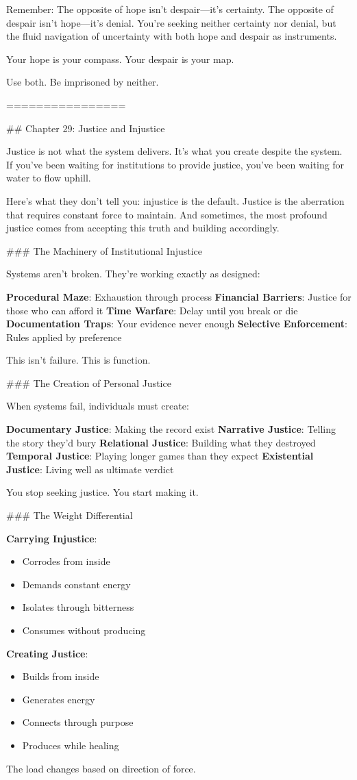 \documentclass[12pt]{book}
\begin{document}
Remember: The opposite of hope isn't despair—it's certainty. The opposite of despair isn't hope—it's denial. You're seeking neither certainty nor denial, but the fluid navigation of uncertainty with both hope and despair as instruments.

Your hope is your compass. Your despair is your map.

Use both. Be imprisoned by neither.

================

\#\# Chapter 29: Justice and Injustice

Justice is not what the system delivers. It's what you create despite the system. If you've been waiting for institutions to provide justice, you've been waiting for water to flow uphill.

Here's what they don't tell you: injustice is the default. Justice is the aberration that requires constant force to maintain. And sometimes, the most profound justice comes from accepting this truth and building accordingly.

\#\#\# The Machinery of Institutional Injustice

Systems aren't broken. They're working exactly as designed:

\textbf{Procedural Maze}: Exhaustion through process
\textbf{Financial Barriers}: Justice for those who can afford it
\textbf{Time Warfare}: Delay until you break or die
\textbf{Documentation Traps}: Your evidence never enough
\textbf{Selective Enforcement}: Rules applied by preference

This isn't failure. This is function.

\#\#\# The Creation of Personal Justice

When systems fail, individuals must create:

\textbf{Documentary Justice}: Making the record exist
\textbf{Narrative Justice}: Telling the story they'd bury
\textbf{Relational Justice}: Building what they destroyed
\textbf{Temporal Justice}: Playing longer games than they expect
\textbf{Existential Justice}: Living well as ultimate verdict

You stop seeking justice. You start making it.

\#\#\# The Weight Differential

\textbf{Carrying Injustice}:
\begin{itemize}
\item Corrodes from inside
\item Demands constant energy
\item Isolates through bitterness
\item Consumes without producing

\end{itemize}
\textbf{Creating Justice}:
\begin{itemize}
\item Builds from inside
\item Generates energy
\item Connects through purpose
\item Produces while healing

\end{itemize}
The load changes based on direction of force.
\end{document}

